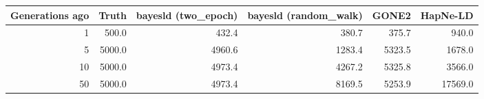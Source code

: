 \begin{tabular}{rrrrrr}
\toprule
Generations ago & Truth & bayesld (two_epoch) & bayesld (random_walk) & GONE2 & HapNe-LD \\
\midrule
1 & 500.0 & 432.4 & 380.7 & 375.7 & 940.0 \\
5 & 5000.0 & 4960.6 & 1283.4 & 5323.5 & 1678.0 \\
10 & 5000.0 & 4973.4 & 4267.2 & 5325.8 & 3566.0 \\
50 & 5000.0 & 4973.4 & 8169.5 & 5253.9 & 17569.0 \\
\bottomrule
\end{tabular}
